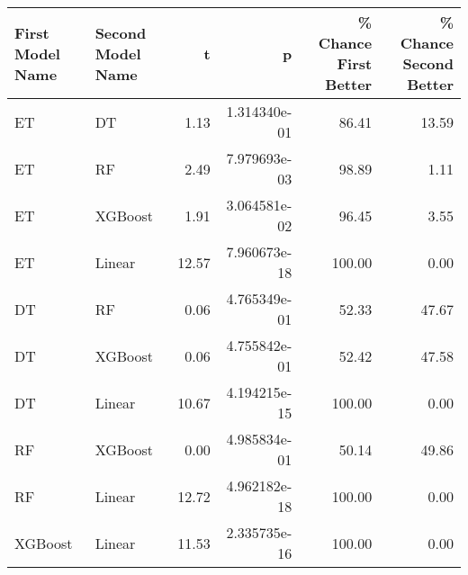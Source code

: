 \begin{tabular}{llrrrr}
\toprule
First Model Name & Second Model Name &     t &            p &  \% Chance First Better &  \% Chance Second Better \\
\midrule
              ET &                DT &  1.13 & 1.314340e-01 &                  86.41 &                   13.59 \\
              ET &                RF &  2.49 & 7.979693e-03 &                  98.89 &                    1.11 \\
              ET &           XGBoost &  1.91 & 3.064581e-02 &                  96.45 &                    3.55 \\
              ET &            Linear & 12.57 & 7.960673e-18 &                 100.00 &                    0.00 \\
              DT &                RF &  0.06 & 4.765349e-01 &                  52.33 &                   47.67 \\
              DT &           XGBoost &  0.06 & 4.755842e-01 &                  52.42 &                   47.58 \\
              DT &            Linear & 10.67 & 4.194215e-15 &                 100.00 &                    0.00 \\
              RF &           XGBoost &  0.00 & 4.985834e-01 &                  50.14 &                   49.86 \\
              RF &            Linear & 12.72 & 4.962182e-18 &                 100.00 &                    0.00 \\
         XGBoost &            Linear & 11.53 & 2.335735e-16 &                 100.00 &                    0.00 \\
\bottomrule
\end{tabular}
